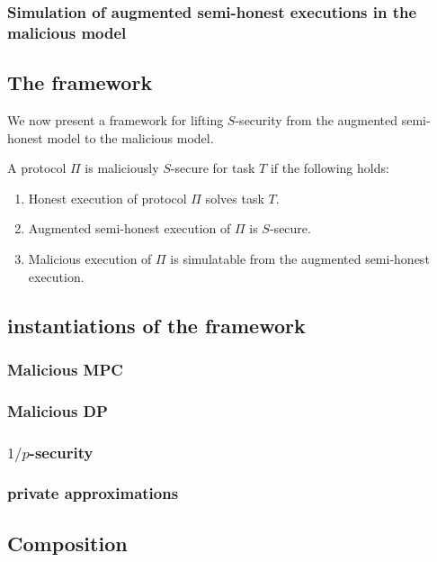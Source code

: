 \documentclass[11pt]{article}
\begin{document}
\subsubsection{Simulation of augmented semi-honest executions in the malicious model}

\subsection{The framework}

We now present a framework for lifting $S$-security from the augmented semi-honest model to the malicious model.

\begin{definition}
A protocol $\Pi$ is maliciously $S$-secure for task $T$ if the following holds:
\begin{enumerate}
    \item Honest execution of protocol $\Pi$ solves task $T$.
    \item Augmented semi-honest execution of $\Pi$ is $S$-secure.
    \item Malicious execution of $\Pi$ is simulatable from the augmented semi-honest execution.
\end{enumerate}

\subsection{instantiations of the framework}

\subsubsection{Malicious MPC}

\subsubsection{Malicious DP}

\subsubsection{$1/p$-security}

\subsubsection{private approximations}

\subsection{Composition}

\end{definition}





\end{document}
